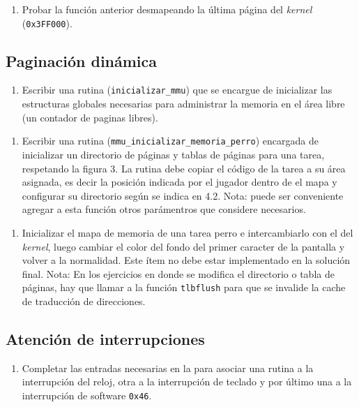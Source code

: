     \begin{enumerate}[resume,label=(\alph*)]
      \item Probar la función anterior desmapeando la última página del \emph{kernel} (\texttt{0x3FF000}).
    \end{enumerate}
  
  \subsection{Paginación dinámica}
    \begin{enumerate}[label=(\alph*)]
      \item Escribir una rutina (\texttt{inicializar\_mmu}) que se encargue de inicializar las estructuras globales necesarias para administrar la memoria en el área libre (un contador de paginas libres).
    \end{enumerate}

    \begin{enumerate}[resume,label=(\alph*)]
      \item Escribir una rutina (\texttt{mmu\_inicializar\_memoria\_perro}) encargada de inicializar un directorio de páginas y tablas de páginas para una tarea, respetando la figura 3. La rutina debe copiar el código de la tarea a su área asignada, es decir la posición indicada por el jugador dentro de el mapa y configurar su directorio según se indica en 4.2.
      Nota: puede ser conveniente agregar a esta función otros parámentros que considere necesarios.
    \end{enumerate}

    \begin{enumerate}[resume,label=(\alph*)]
      \item Inicializar el mapa de memoria de una tarea perro e intercambiarlo con el del \emph{kernel}, luego cambiar el color del fondo del primer caracter de la pantalla y volver a la normalidad. Este ítem no debe estar implementado en la solución final.
      Nota: En los ejercicios en donde se modifica el directorio o tabla de páginas, hay que llamar a la función \texttt{tlbflush} para que se invalide la cache de traducción de direcciones.
    \end{enumerate}
  
  \subsection{Atención de interrupciones}
    \begin{enumerate}[label=(\alph*)]
      \item Completar las entradas necesarias en la  para asociar una rutina a la interrupción del reloj, otra a la interrupción de teclado y por último una a la interrupción de software \texttt{0x46}.
    \end{enumerate}

